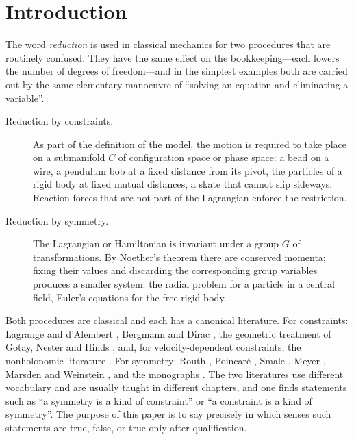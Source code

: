 \documentclass[11pt,a4paper]{article}
\numberwithin{equation}{section}
\theoremstyle{plain}
\theoremstyle{definition}
\theoremstyle{remark}
\begin{document}
\section{Introduction}\label{sec:intro}

The word \emph{reduction} is used in classical mechanics for two procedures that are routinely confused.
They have the same effect on the bookkeeping---each lowers the number of degrees of freedom---and in the simplest examples both are carried out by the same elementary manoeuvre of ``solving an equation and eliminating a variable''.

\begin{description}
\item[Reduction by constraints.] As part of the definition of the model, the motion is required to take place on a submanifold $C$ of configuration space or phase space: a bead on a wire, a pendulum bob at a fixed distance from its pivot, the particles of a rigid body at fixed mutual distances, a skate that cannot slip sideways. Reaction forces that are not part of the Lagrangian enforce the restriction.
\item[Reduction by symmetry.] The Lagrangian or Hamiltonian is invariant under a group $G$ of transformations. By Noether's theorem there are conserved momenta; fixing their values and discarding the corresponding group variables produces a smaller system: the radial problem for a particle in a central field, Euler's equations for the free rigid body.
\end{description}

Both procedures are classical and each has a canonical literature.
For constraints: Lagrange and d'Alembert \cite{dalembert,lagrange}, Bergmann and Dirac \cite{bergmann1949,dirac1950,dirac1964}, the geometric treatment of Gotay, Nester and Hinds \cite{gnh1978}, and, for velocity-dependent constraints, the nonholonomic literature \cite{akn,bloch2003}.
For symmetry: Routh \cite{routh1877}, Poincar\'e \cite{poincare1901}, Smale \cite{smale1970}, Meyer \cite{meyer1973}, Marsden and Weinstein \cite{mw1974}, and the monographs \cite{am1978,marsden1992,mr1999,op2004}.
The two literatures use different vocabulary and are usually taught in different chapters, and one finds statements such as ``a symmetry is a kind of constraint'' or ``a constraint is a kind of symmetry''.
The purpose of this paper is to say precisely in which senses such statements are true, false, or true only after qualification.
\end{document}
